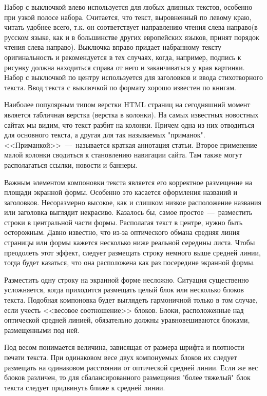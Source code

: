 \documentclass[14pt]{extarticle}
\begin{document}
Набор с выключкой влево используется для любых длинных текстов, особенно при узкой полосе набора. Считается, что текст, выровненный по левому краю, читать удобнее всего, т.к. он соответствует направлению чтения слева направо(в русском языке, как и в большинстве других европейских языков, принят порядок чтения слева направо). Выключка вправо придает набранному тексту оригинальность и рекомендуется в тех случаях, когда, например, подпись к рисунку должна находиться справа от него и заканчиваться у края картинки. Набор с выключкой по центру используется для заголовков и ввода стихотворного текста. Ввод текста с выключкой по формату хорошо известен по книгам.

Наиболее популярным типом верстки HTML страниц на сегодняшний момент является табличная верстка (верстка в колонки). На самых известных новостных сайтах мы видим, что текст разбит на колонки. Причем одна из них отводиться для основного текста, а другая для так называемых "приманок". <<Приманкой>>~---~называется краткая аннотация статьи. Второе применение малой колонки сводиться к становлению навигации сайта. Там также могут располагаться ссылки, новости и баннеры.

Важным элементом компоновки текста является его корректное размещение на площади экранной формы. Особенно это касается оформления названий и заголовков. Несоразмерно высокое, как и слишком низкое расположение названия или заголовка выглядит некрасиво. Казалось бы, самое простое~---~разместить строки в центральной части формы. Располагая текст в центре, нужно быть осторожным. Давно известно, что из-за оптического обмана средняя линия страницы или формы кажется несколько ниже реальной середины листа. Чтобы преодолеть этот эффект, следует размещать строку немного выше средней линии, тогда будет казаться, что она расположена как раз посередине экранной формы.

Разместить одну строку на экранной форме несложно. Ситуация существенно усложняется, когда приходится размещать целый блок или несколько блоков текста. Подобная компоновка будет выглядеть гармоничной только в том случае, если учесть <<весовое соотношение>> блоков. Блоки, расположенные над оптической средней линией, обязательно должны уравновешиваются блоками, размещенными под ней.

Под весом понимается величина, зависящая от размера шрифта и плотности печати текста. При одинаковом весе двух компонуемых блоков их следует размещать на одинаковом расстоянии от оптической средней линии. Если же вес блоков различен, то для сбалансированного размещения "более тяжелый" блок текста следует придвинуть ближе к средней линии.
\end{document}
